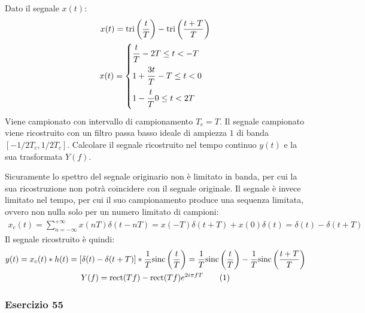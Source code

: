 \documentclass{article}
\newcommand{\rect}{\mathrm{rect}}
\newcommand{\sinc}{\mathrm{sinc}}
\newcommand{\tri}{\mathrm{tri}}
\newcommand{\tageq}{\tag{\stepcounter{equation}\theequation}}
\begin{document}
Dato il segnale $x(t)$:
\begin{gather*}
    x(t)=\tri \left(\displaystyle\frac{t}{T}\right)-\tri \left(\frac{t+T}{T}\right)\\
    x(t)=\begin{cases}
        \displaystyle\frac{\strut t}{\strut T} -2T\leq t<-T\\
        1+\displaystyle\frac{\strut 3t}{\strut T} -T\leq t<0\\
        1-\displaystyle\frac{\strut t}{\strut T} 0\leq t<2T
    \end{cases}
\end{gather*}
Viene campionato con intervallo di campionamento $T_c=T$. Il segnale campionato viene ricostruito con un filtro passa basso ideale di ampiezza $1$ di banda $[-1/2T_c,1/2T_c]$. 
Calcolare il segnale ricostruito nel tempo continuo $y(t)$ e la sua trasformata $Y(f)$. 

Sicuramente lo spettro del segnale originario non è limitato in banda, per cui la sua ricostruzione non potrà coincidere con il segnale originale. Il segnale è invece limitato 
nel tempo, per cui il suo campionamento produce una sequenza limitata, ovvero non nulla solo per un numero limitato di campioni:
\begin{gather*}
    x_c(t)=\displaystyle\sum_{n=-\infty}^{+\infty}x(nT)\delta(t-nT)=x(-T)\delta(t+T)+x(0)\delta(t)=\delta(t)-\delta(t+T)
\end{gather*}
Il segnale ricostruito è quindi:
\begin{gather*}
    y(t)=x_c(t)*h(t)=\left[\delta(t)-\delta(t+T)\right]*\frac{1}{T}\sinc\left(\frac{t}{T}\right)=\frac{1}{T}\sinc\left(\frac{t}{T}\right)-\frac{1}{T}\sinc\left(\frac{t+T}{T}\right)\\
    Y(f)=\rect(Tf)-\rect(Tf)e^{2i\pi fT}\tageq
\end{gather*}

\subsubsection*{Esercizio 55}
\end{document}
